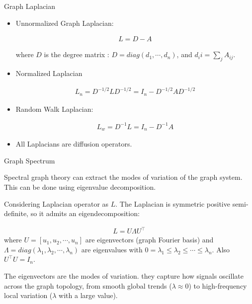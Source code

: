 \documentclass[aspectratio=169,xcolor=dvipsnames,svgnames,x11names,fleqn]{beamer}
\begin{document}
\begin{frame}{Graph Laplacian}

\begin{itemize}
\item Unnormalized Graph Laplacian:

\begin{align*}
L = D - A
\end{align*}

where $D$ is the degree matrix : $D = diag(d_1, \cdots, d_n)$, and $d_ii = \sum_j A_{ij}$.

\item Normalized Laplacian

\begin{align*}
L_n = D^{-1/2} L D^{-1/2} = I_n - D^{-1/2}A D^{-1/2}
\end{align*}

\item Random Walk Laplacian:

\begin{align*}
L_w = D^{-1}L = I_n - D^{-1}A
\end{align*}

\item All Laplacians are diffusion operators.
\end{itemize}

\end{frame}


\begin{frame}{Graph Spectrum}

\footnotesize

Spectral graph theory can extract the modes of variation of the graph system. This can be done using eigenvalue decomposition.

\begin{tcolorbox}[    enhanced,
    colback=uiCream,
    colframe=embedEmerald,
    sharp corners,
    arc=0pt, 
    boxrule=0.4pt,
    leftrule=3pt,
    borderline west={5pt}{0pt}{embedEmerald}, 
    fontupper=\color{wpDark},
    pad at break*=0mm,
    top=1pt, bottom=2pt, left=5pt, right=5pt]
    
    Considering Laplacian operator as $L$.  The Laplacian is symmetric positive semi-definite, so it admits an eigendecomposition:
    
    \begin{align*}
    L = U \Lambda U^\top  
    \end{align*}
    where $U = [u_1, u_2, \cdots, u_n]$ are eigenvectors (graph Fourier basis) and $\Lambda  = diag(\lambda_1, \lambda_2, \cdots, \lambda_n)$ are eigenvalues with $0 = \lambda_1 \leq \lambda_2 \leq  \cdots \leq \lambda_n$. Also $U^\top U = I_n$. 
    
    \vspace{10pt}
    
    The eigenvectors are the modes of variation.  they capture how signals oscillate across the graph topology, from smooth global trends ($\lambda \approx 0$) to high-frequency local variation ($\lambda$ with a large value).
    
\end{tcolorbox}


\end{frame}
\end{document}
